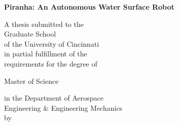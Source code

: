 \begin{titlepage}
    \begin{center}
        \vspace*{0.8cm}
        
        {\LARGE \selectfont \bfseries
            Piranha: An Autonomous Water Surface Robot \\
        }

        \vfill
        
        {\fontsize{12pt}{24pt}\selectfont
        A thesis submitted to the \\
        Graduate School \\
        of the University of Cincinnati \\
        in partial fulfillment of the \\
        requirements for the degree of \\
        
        \vspace{1cm}
        
        Master of Science
        
        \vspace{1cm}
        
        in the Department of Aerospace \\ 
        Engineering \& Engineering Mechanics \\
        by \\
        
}
\end{center}
\end{titlepage}
